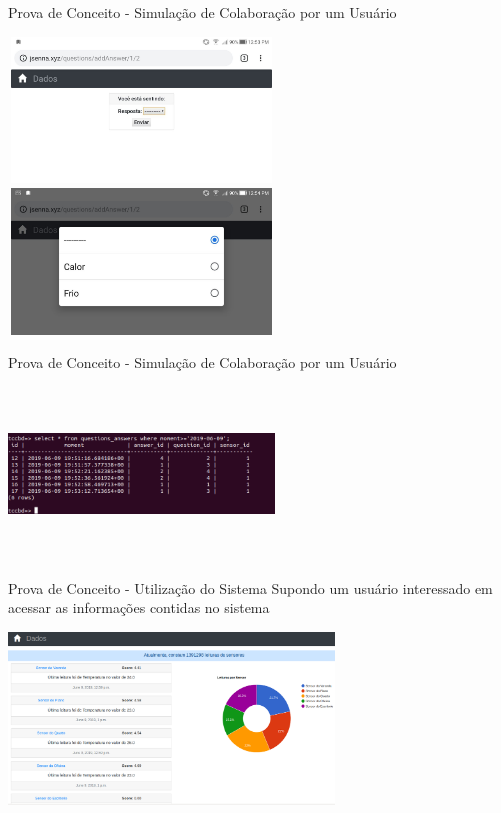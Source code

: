\documentclass{beamer}
\begin{document}
    \begin{frame}{Prova de Conceito - Simulação de Colaboração por um Usuário}
      \begin{center}
      \includegraphics[height=110pt, width=200pt]{prova6}
      \includegraphics[height=110pt, width=200pt]{prova7}
      \end{center}
    \end{frame}
    \begin{frame}{Prova de Conceito - Simulação de Colaboração por um Usuário}
      \begin{center}
        \includegraphics[height=130pt, width=200pt]{prova12}
      \end{center}
    \end{frame}
    \begin{frame}{Prova de Conceito - Utilização do Sistema}
      \quad Supondo um usuário interessado em acessar as informações contidas no sistema
      \begin{center}
      \includegraphics[height=130pt, width=\textwidth]{prova8}
      \end{center}
    \end{frame}
\end{document}
